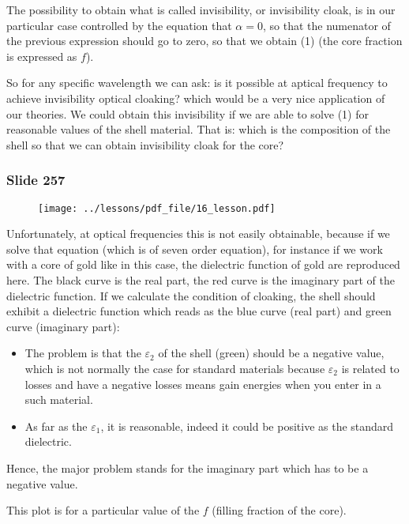 \documentclass[../main/main.tex]{subfiles}
\begin{document}
The possibility to obtain what is called invisibility, or invisibility cloak, is in our particular case controlled by the equation that \( \alpha =0 \), so that the numenator of the previous expression should go to zero, so that we obtain (1) (the core fraction is expressed as \( f \)).

So for any specific wavelength we can ask: is it possible at aptical frequency to achieve invisibility optical cloaking? which would be a very nice application of our theories.
We could obtain this invisibility if we are able to solve (1) for reasonable values of the shell material. That is: which is the composition of the shell so that we can obtain invisibility cloak for the core?

\newpage

\subsubsection{Slide 257}

\begin{figure}[h!]
\centering
\texttt{[image: ../lessons/pdf\_file/16\_lesson.pdf]}
\end{figure}

Unfortunately, at optical frequencies this is not easily obtainable, because if we solve that equation (which is of seven order equation), for instance if we work with a core of gold like in this case, the dielectric function of gold are reproduced here. The black curve is the real part, the red curve is the imaginary part of the dielectric function. If we calculate the condition of cloaking, the shell should exhibit a dielectric function which reads as the blue curve (real part) and green curve (imaginary part):
\begin{itemize}
\item The problem is that the \( \varepsilon _2 \) of the shell (green) should be a negative value, which is not normally the case for standard materials because \( \varepsilon _2 \) is related to losses and have a negative losses means gain energies when you enter in a such material.
\item As far as the \( \varepsilon _1 \), it is reasonable, indeed it could be positive as the standard dielectric.
\end{itemize}
Hence, the major problem stands for the imaginary part which has to be a negative value.

This plot is for a particular value of the \( f \) (filling fraction of the core).
\end{document}
